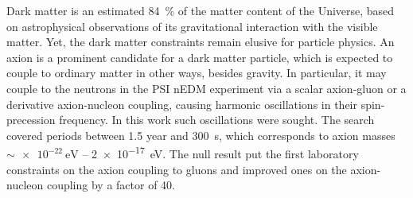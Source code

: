 Dark matter is an estimated \SI{84}{\percent} of the matter content of the Universe, based on astrophysical observations of its gravitational interaction with the visible matter.
Yet, the dark matter constraints remain elusive for particle physics.
An axion is a prominent candidate for a dark matter particle, which is expected to couple to ordinary matter in other ways, besides gravity.
In particular, it may couple to the neutrons in the PSI nEDM experiment via a scalar axion-gluon or a derivative axion-nucleon coupling, causing harmonic oscillations in their spin-precession frequency.
In this work such oscillations were sought.
The search covered periods between \num{1.5} year and \SI{300}{\second}, which corresponds to axion masses $\sim \SI{e-22}{\electronvolt}$ -- \SI{2e-17}{\electronvolt}.
The null result put the first laboratory constraints on the axion coupling to gluons and improved ones on the axion-nucleon coupling by a factor of 40.

\enlargethispage{2\baselineskip}

\endgroup			

\vfill
